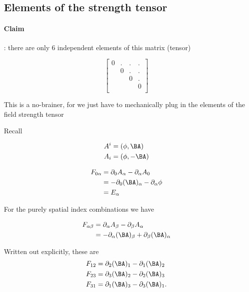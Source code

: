 \subsection{Elements of the strength tensor}

\paragraph{Claim}: there are only 6 independent elements of this matrix (tensor)

\begin{equation}\label{eqn:relativisticElectrodynamicsL11:50}
\begin{bmatrix}
0 & . & . & . \\ 
  & 0 & . & . \\ 
  &   & 0 & . \\ 
  &   &   & 0 \\ 
\end{bmatrix}
\end{equation}

This is a no-brainer, for we just have to mechanically plug in the elements of the field strength tensor

Recall

\begin{align}\label{eqn:relativisticElectrodynamicsL11:70}
A^i &= (\phi, \BA) \\
A_i &= (\phi, -\BA)
\end{align}

\begin{align*}
F_{0\alpha} 
&= 
\partial_0 A_\alpha - \partial_\alpha A_0  \\
&= 
-\partial_0 (\BA)_\alpha - \partial_\alpha \phi  \\
&= E_\alpha
\end{align*}

For the purely spatial index combinations we have

\begin{align*}
F_{\alpha\beta} 
&= \partial_\alpha A_\beta - \partial_\beta A_\alpha  \\
&= -\partial_\alpha (\BA)_\beta + \partial_\beta (\BA)_\alpha  \\
\end{align*}

Written out explicitly, these are
\begin{align}\label{eqn:relativisticElectrodynamicsL11:90}
F_{12} &= \partial_2 (\BA)_1 -\partial_1 (\BA)_2  \\
F_{23} &= \partial_3 (\BA)_2 -\partial_2 (\BA)_3  \\
F_{31} &= \partial_1 (\BA)_3 -\partial_3 (\BA)_1 .
\end{align}

